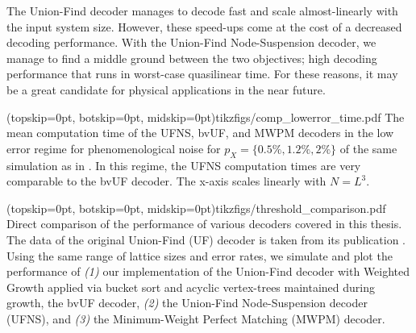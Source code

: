 The Union-Find decoder manages to decode fast and scale almost-linearly with the input system size. However, these speed-ups come at the cost of a decreased decoding performance. With the Union-Find Node-Suspension decoder, we manage to find a middle ground between the two objectives; high decoding performance that runs in worst-case quasilinear time. For these reasons, it may be a great candidate for physical applications in the near future.

\Figure[b!](topskip=0pt, botskip=0pt, midskip=0pt){tikzfigs/comp_lowerror_time.pdf}{
  The mean computation time of the UFNS, bvUF, and MWPM decoders in the low error regime for phenomenological noise for $p_X = \{0.5\%, 1.2\%, 2\%\}$ of the same simulation as in . In this regime, the UFNS computation times are very comparable to the bvUF decoder. The x-axis scales linearly with $N = L^3$. \label{comp_lowerror_time}}


\Figure[htb](topskip=0pt, botskip=0pt, midskip=0pt){tikzfigs/threshold_comparison.pdf}{
  Direct comparison of the performance of various decoders covered in this thesis. The data of the original Union-Find (UF) decoder is taken from its publication \cite{delfosse2017almost}. Using the same range of lattice sizes and error rates, we simulate and plot the performance of \emph{(1)} our implementation of the Union-Find decoder with Weighted Growth applied via bucket sort and acyclic vertex-trees maintained during growth, the bvUF decoder, \emph{(2)} the Union-Find Node-Suspension decoder (UFNS), and  \emph{(3)} the Minimum-Weight Perfect Matching (MWPM) decoder.\label{thres_comp}}